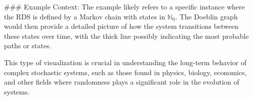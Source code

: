 ### Example Context:
The example likely refers to a specific instance where the RDS is defined by a Markov chain with states in \(\mathds{N}_0\). The Doeblin graph would then provide a detailed picture of how the system transitions between these states over time, with the thick line possibly indicating the most probable paths or states.

This type of visualization is crucial in understanding the long-term behavior of complex stochastic systems, such as those found in physics, biology, economics, and other fields where randomness plays a significant role in the evolution of systems.